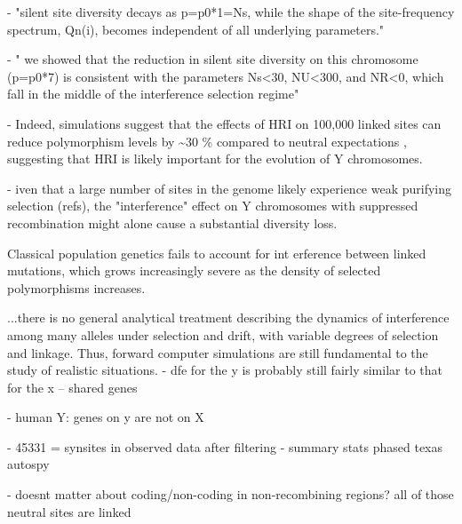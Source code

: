 \documentclass[9pt,twocolumn,twoside]{gsajnl}
\begin{document}
- "silent site diversity decays as p=p0*1=Ns, while the shape of the site-frequency spectrum, Qn(i), becomes independent of all underlying parameters."

- " we showed that the reduction in silent site diversity on this chromosome (p=p0*7) is consistent with the parameters Ns<30, NU<300, and NR<0, which fall in the middle of the interference selection regime"

- Indeed, simulations suggest that the effects of HRI on 100,000 linked sites can reduce polymorphism levels by \textasciitilde 30 \% compared to neutral expectations \citep{mcvean2000}, suggesting that HRI is likely important for the evolution of Y chromosomes.

- iven that a large number of sites in the genome likely experience weak purifying selection (\X refs), the "interference" effect on Y chromosomes with suppressed recombination might alone cause a substantial diversity loss.



Classical population genetics fails to account for int
erference between linked mutations, which grows increasingly severe as the density of selected polymorphisms increases.


...there is no general analytical treatment describing the dynamics of interference among many alleles under selection and drift, with variable degrees of selection and linkage. Thus, forward computer simulations are still fundamental to the study of realistic situations.
- dfe for the y is probably still fairly similar to that for the x -- shared genes

- human Y: genes on y are not on X

- 45331 = synsites in observed data after filtering
  - summary stats phased texas autospy

- doesnt matter about coding/non-coding in non-recombining regions? all of those neutral sites are linked





\end{document}
